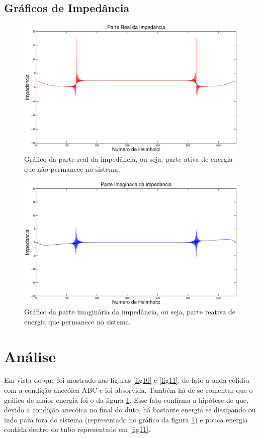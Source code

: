 \subsection{Gráficos de Impedância}
\begin{figure}[h!]
    \centering
 	\hspace{-1.5cm}
    \includegraphics[width=1\textwidth]{code_matlab/code_refactored/closed-anechoic/parte_real_ativa.eps}
    \caption{Gráfico da parte real da impedância, ou seja, parte ativa de energia que não permanece no sistema.}
    \label{fig12}
\end{figure}
\begin{figure}[h!]
    \centering
 	\hspace{-1.5cm}
    \includegraphics[width=1\textwidth]{code_matlab/code_refactored/closed-anechoic/parte_imaginaria_reativa.eps}
    \caption{Gráfico da parte imaginária da impedância, ou seja, parte reativa de energia que permanece no sistema.}
    \label{fig13}
\end{figure}

\section{Análise}
Em vista do que foi mostrado nas figuras \ref{fig10} e \ref{fig11}, de fato a onda colidiu com a condição anecóica ABC e foi absorvida. Também há de se comentar que o gráfico de maior energia foi o da figura \ref{fig12}. Esse fato confirma a hipótese de que, devido a condição anecóica no final do duto, há bastante energia se dissipando ou indo para fora do sistema (representado no gráfico da figura \ref{fig12}) e pouca energia contida dentro do tubo representado em \ref{fig11}.

